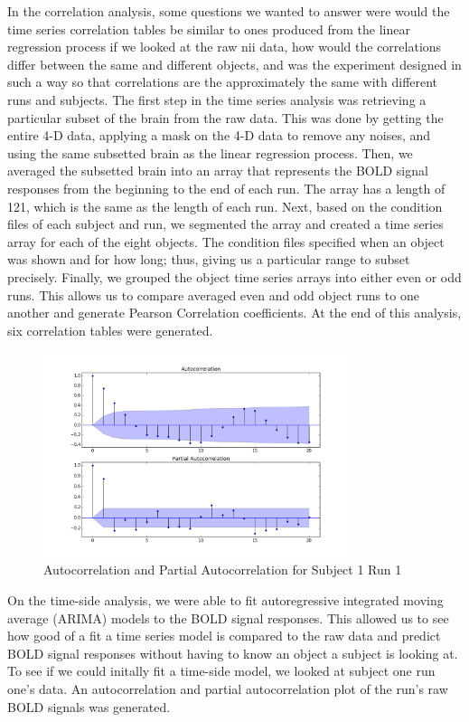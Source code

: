 \documentclass[11pt,twocolumn]{article}
\begin{document}
In the correlation analysis, some questions we wanted to answer were
would the time series correlation tables be similar to ones produced from
the linear regression process if we looked at the raw nii data, how would
the correlations differ between the same and different objects, and was the
experiment designed in such a way so that correlations are the approximately
the same with different runs and subjects. The first step in the time series
analysis was retrieving a particular subset of the brain from the raw data.
This was done by getting the entire 4-D data, applying a mask on the 4-D data
to remove any noises, and using the same subsetted brain as the linear
regression process. Then, we averaged the subsetted brain into an array that
represents the BOLD signal responses from the beginning to the end of each run.
The array has a length of 121, which is the same as the length of each run.
Next, based on the condition files of each subject and run, we segmented the
array and created a time series array for each of the eight objects. The
condition files specified when an object was shown and for how long; thus,
giving us a particular range to subset precisely. Finally, we grouped the
object time series arrays into either even or odd runs. This allows us to
compare averaged even and odd object runs to one another and generate
Pearson Correlation coefficients. At the end of this analysis, six correlation
tables were generated.

\begin{figure}[h!]                                                              
\centering                                                                      
\includegraphics[width=90mm]{sub001_run001_corrFunc.png}                   
\caption{Autocorrelation and Partial Autocorrelation for Subject 1 Run 1}                                    
\end{figure}


On the time-side analysis, we were able to fit autoregressive integrated
moving average (ARIMA) models to the BOLD signal responses. This allowed us to
see how good of a fit a time series model is compared to the raw data and 
predict BOLD signal responses without having to know an object a subject is 
looking at. To see if we could initally fit a time-side model, we looked at
subject one run one's data. An autocorrelation and partial autocorrelation 
plot of the run's raw BOLD signals was generated. 
\end{document}
